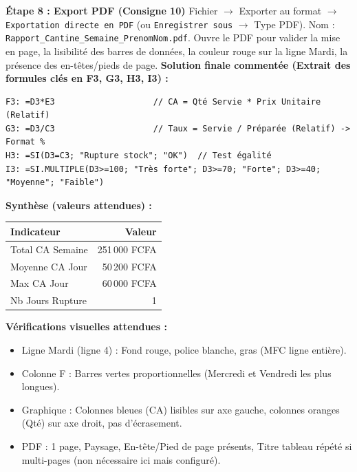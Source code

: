 \documentclass[11pt]{article}
\begin{document}
\begin{exoresolu}
\textbf{Étape 8 : Export PDF (Consigne 10)}
Fichier $\rightarrow$ Exporter au format $\rightarrow$ \texttt{Exportation directe en PDF} (ou \texttt{Enregistrer sous} $\rightarrow$ Type PDF). Nom : \texttt{Rapport\_Cantine\_Semaine\_PrenomNom.pdf}. Ouvre le PDF pour valider la mise en page, la lisibilité des barres de données, la couleur rouge sur la ligne Mardi, la présence des en-têtes/pieds de page.
\tcblower
\textbf{Solution finale commentée (Extrait des formules clés en F3, G3, H3, I3) :}
\begin{lstlisting}
F3: =D3*E3                    // CA = Qté Servie * Prix Unitaire (Relatif)
G3: =D3/C3                    // Taux = Servie / Préparée (Relatif) -> Format %
H3: =SI(D3=C3; "Rupture stock"; "OK")  // Test égalité
I3: =SI.MULTIPLE(D3>=100; "Très forte"; D3>=70; "Forte"; D3>=40; "Moyenne"; "Faible")
\end{lstlisting}
\textbf{Synthèse (valeurs attendues) :}
\begin{center}
\begin{tabular}{|l|r|}
\hline
\rowcolor{popblueL} \textbf{Indicateur} & \textbf{Valeur} \\
\hline
Total CA Semaine & 251\,000 FCFA \\
Moyenne CA Jour & 50\,200 FCFA \\
Max CA Jour & 60\,000 FCFA \\
Nb Jours Rupture & 1 \\
\hline
\end{tabular}
\end{center}
\textbf{Vérifications visuelles attendues :}
\begin{itemize}
    \item Ligne Mardi (ligne 4) : Fond rouge, police blanche, gras (MFC ligne entière).
    \item Colonne F : Barres vertes proportionnelles (Mercredi et Vendredi les plus longues).
    \item Graphique : Colonnes bleues (CA) lisibles sur axe gauche, colonnes oranges (Qté) sur axe droit, pas d'écrasement.
    \item PDF : 1 page, Paysage, En-tête/Pied de page présents, Titre tableau répété si multi-pages (non nécessaire ici mais configuré).
\end{itemize}
\end{exoresolu}
\end{document}
